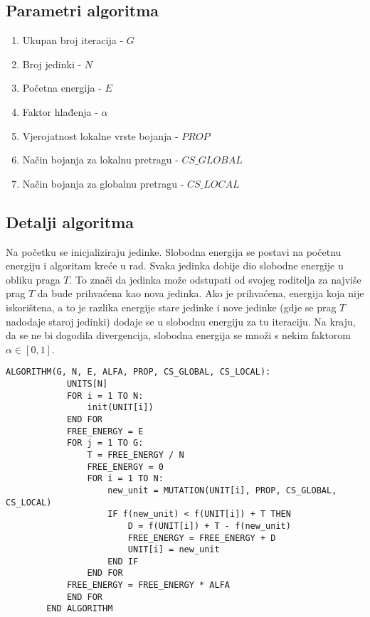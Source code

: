 \documentclass[times, utf8, diplomski, numeric]{fer}
\begin{document}
\subsection{Parametri algoritma}

\begin{enumerate}
	\item Ukupan broj iteracija - $G$
	\item Broj jedinki - $N$
	\item Početna energija - $E$
	\item Faktor hlađenja - $\alpha$
	\item Vjerojatnost lokalne vrste bojanja - $PROP$
	\item Način bojanja za lokalnu pretragu - $CS\_GLOBAL$
	\item Način bojanja za globalnu pretragu - $CS\_LOCAL$
\end{enumerate}


\subsection{Detalji algoritma}

Na početku se inicjaliziraju jedinke. Slobodna energija se postavi na početnu energiju i algoritam kreće u rad. Svaka jedinka dobije dio slobodne energije u obliku praga $T$. To znači da jedinka može odstupati od svojeg roditelja za najviše prag $T$ da bude prihvaćena kao nova jedinka. Ako je prihvaćena, energija koja nije iskorištena, a to je razlika energije stare jedinke i nove jedinke (gdje se prag $T$ nadodaje staroj jedinki) dodaje se u slobodnu energiju za tu iteraciju. Na kraju, da se ne bi dogodila divergencija, slobodna energija se množi s nekim faktorom $\alpha \in [0,1]$.  

\begin{singlespace}
	\begin{lstlisting}[caption=Pseudok\^{o}d genetskog kaljenja]
		ALGORITHM(G, N, E, ALFA, PROP, CS_GLOBAL, CS_LOCAL):
			UNITS[N]
			FOR i = 1 TO N:
				init(UNIT[i])
			END FOR
			FREE_ENERGY = E
			FOR j = 1 TO G:
				T = FREE_ENERGY / N
				FREE_ENERGY = 0
				FOR i = 1 TO N:
					new_unit = MUTATION(UNIT[i], PROP, CS_GLOBAL, CS_LOCAL)
					IF f(new_unit) < f(UNIT[i]) + T THEN
						D = f(UNIT[i]) + T - f(new_unit)
						FREE_ENERGY = FREE_ENERGY + D
						UNIT[i] = new_unit
					END IF
				END FOR
			FREE_ENERGY = FREE_ENERGY * ALFA
			END FOR
		END ALGORITHM
	\end{lstlisting}
\end{singlespace}
\end{document}
